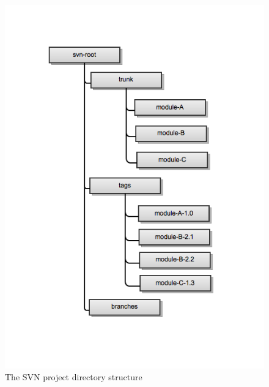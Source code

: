 \begin{itemize}
\begin{figure}[h]
\label{fig:fig_svn}
\begin{center}
\includegraphics[scale=0.5]{./data/spice-svn.png}
\caption{The SVN project directory structure}
\end{center}
\end{figure}	
	

\end{itemize}
